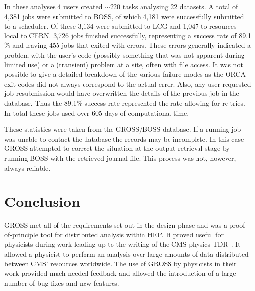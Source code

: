 In these analyses 4 users created $\sim$220 tasks analysing 22 datasets. A total of 4,381 jobs were submitted to BOSS, of which 4,181 were successfully submitted to a scheduler. Of these 3,134 were submitted to LCG and 1,047 to resources local to CERN. 3,726 jobs finished successfully, representing a success rate of 89.1$\%$ and leaving 455 jobs that exited with errors. These errors generally indicated a problem with the user's code (possibly something that was not apparent during limited use) or a (transient) problem at a site, often with file access. It was not possible to give a detailed breakdown of the various failure modes as the ORCA exit codes did not always correspond to the actual error. Also, any user requested job resubmission would have overwritten the details of the previous job in the database. Thus the 89.1$\%$ success rate represented the rate allowing for re-tries. In total these jobs used over 605 days of computational time.

These statistics were taken from the GROSS/BOSS database. If a running job was unable to contact the database the records may be incomplete. In this case GROSS attempted to correct the situation at the output retrieval stage by running BOSS with the retrieved journal file. This process was not, however, always reliable.

%

\section{Conclusion}
GROSS met all of the requirements set out in the design phase and was a proof-of-principle tool for distributed analysis within HEP. It proved useful for physicists during work leading up to the writing of the CMS physics TDR~\cite{CMS_TDR_PHYS_vol1}. It allowed a physicist to perform an analysis over large amounts of data distributed between CMS' resources worldwide. The use of GROSS by physicists in their work provided much needed-feedback and allowed the introduction of a large number of bug fixes and new features. 


